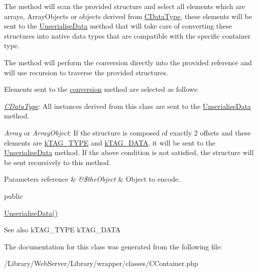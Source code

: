 The method will scan the provided structure and select all elements which are arrays, Array\-Objects or objects derived from \hyperlink{class_c_data_type}{C\-Data\-Type}, these elements will be sent to the \hyperlink{class_c_container_a09d585e2a9809221a42d52d7520c9cbf}{Unserialise\-Data} method that will take care of converting these structures into native data types that are compatible with the specific container type.

The method will perform the conversion directly into the provided reference and will use recursion to traverse the provided structures.

Elements sent to the \hyperlink{class_c_container_a09d585e2a9809221a42d52d7520c9cbf}{conversion} method are selected as follows\-:


\begin{DoxyItemize}
\item {\itshape \hyperlink{class_c_data_type}{C\-Data\-Type}}\-: All instances derived from this class are sent to the \hyperlink{class_c_container_a09d585e2a9809221a42d52d7520c9cbf}{Unserialise\-Data} method. 
\item {\itshape Array} or {\itshape Array\-Object}\-: If the structure is composed of exactly 2 offsets and these elements are \hyperlink{}{k\-T\-A\-G\-\_\-\-T\-Y\-P\-E} and \hyperlink{}{k\-T\-A\-G\-\_\-\-D\-A\-T\-A}, it will be sent to the \hyperlink{class_c_container_a09d585e2a9809221a42d52d7520c9cbf}{Unserialise\-Data} method. If the above condition is not satisfied, the structure will be sent recursively to this method. 
\end{DoxyItemize}


\begin{DoxyParams}[1]{Parameters}
reference & {\em \&\$the\-Object} & Object to encode.\\
\hline
\end{DoxyParams}
public

\hyperlink{class_c_container_a09d585e2a9809221a42d52d7520c9cbf}{Unserialise\-Data()}

\begin{DoxySeeAlso}{See also}
k\-T\-A\-G\-\_\-\-T\-Y\-P\-E k\-T\-A\-G\-\_\-\-D\-A\-T\-A 
\end{DoxySeeAlso}


The documentation for this class was generated from the following file\-:\begin{DoxyCompactItemize}
\item 
/\-Library/\-Web\-Server/\-Library/wrapper/classes/C\-Container.\-php\end{DoxyCompactItemize}
